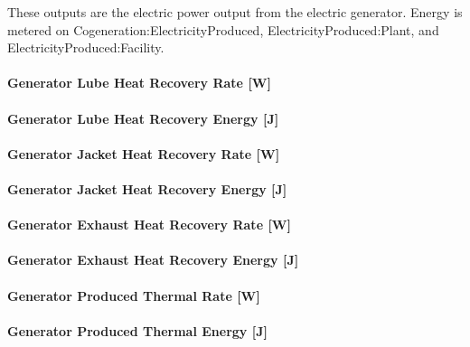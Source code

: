These outputs are the electric power output from the electric generator. Energy is metered on Cogeneration:ElectricityProduced, ElectricityProduced:Plant, and ElectricityProduced:Facility.

\paragraph{Generator Lube Heat Recovery Rate {[}W{]}}\label{generator-lube-heat-recovery-rate-w}

\paragraph{Generator Lube Heat Recovery Energy {[}J{]}}\label{generator-lube-heat-recovery-energy-j}

\paragraph{Generator Jacket Heat Recovery Rate {[}W{]}}\label{generator-jacket-heat-recovery-rate-w}

\paragraph{Generator Jacket Heat Recovery Energy {[}J{]}}\label{generator-jacket-heat-recovery-energy-j}

\paragraph{Generator Exhaust Heat Recovery Rate {[}W{]}}\label{generator-exhaust-heat-recovery-rate-w}

\paragraph{Generator Exhaust Heat Recovery Energy {[}J{]}}\label{generator-exhaust-heat-recovery-energy-j}

\paragraph{Generator Produced Thermal Rate {[}W{]}}\label{generator-produced-thermal-rate-w}

\paragraph{Generator Produced Thermal Energy {[}J{]}}\label{generator-produced-thermal-energy-j}

